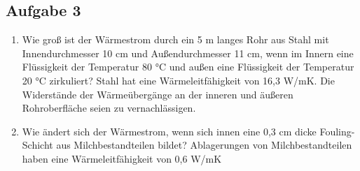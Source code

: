 \documentclass[a4paper,11pt]{article}
\newif\ifshowme
\numberwithin{equation}{section}
\begin{document}
\subsection*{Aufgabe 3}

\begin{enumerate}[label=\alph*),itemsep=-3mm]

\item 
Wie groß ist der Wärmestrom durch ein 5 m langes Rohr aus Stahl mit
Innendurchmesser 10 cm und Außendurchmesser 11 cm, wenn im Innern eine
Flüssigkeit der Temperatur 80 °C und außen eine Flüssigkeit der Temperatur
20 °C zirkuliert? Stahl hat eine Wärmeleitfähigkeit von 16,3 W/mK. Die
Widerstände der Wärmeübergänge an der inneren und äußeren Rohroberfläche
seien zu vernachlässigen.

\ifshowme
\antwort{
\begin{align*}
\dot{Q} &= (T_i - T_a) \frac{2 \pi l \cdot \lambda}{\ln(\frac{r_i}{r_a})} \\
\dot{Q} &= 60~ \text{°C} \cdot \frac{2 \pi \cdot 5~\text{m} \cdot 16,3~ \text{W/m°C} }{\ln(\frac{55}{50})} \\
	&= 322.366,15~ \text{W}
\end{align*}
}
\else
\fi



\begin{marginfigure}[-3cm]
\caption{Stahlrohr mit innerer Fouling-Schicht.}
\end{marginfigure}

\item Wie ändert sich der Wärmestrom, wenn sich innen eine 0,3 cm dicke Fouling-Schicht aus
Milchbestandteilen bildet? Ablagerungen von Milchbestandteilen haben eine Wärmeleitfähigkeit von 0,6 W/mK
\end{enumerate}

\ifshowme
\antwort{
\begin{align*}
\dot{Q} &= 2 \pi \cdot l \cdot (T_i - T_a) \cdot \left( \frac{\ln(\frac{r_{SA}}{r_{SI}})}{\lambda_1} + \frac{\ln(\frac{r_{SI}}{r_{F}})}{\lambda_2} \right)^{-1} \\
\dot{Q} &= 2 \pi \cdot 5~\text{m} \cdot 60~ \text{°C} \cdot \left( {\frac{\ln(\frac{0,055}{0,05})}{16,3~ \text{W/m°C}} + \frac{\ln(\frac{0,05}{0,047})}{0.6~ \text{W/m°C}}} \right)^{-1} \\
	&= 17.297,47~ \text{W}
\end{align*}
}
\else
\fi
\end{document}
